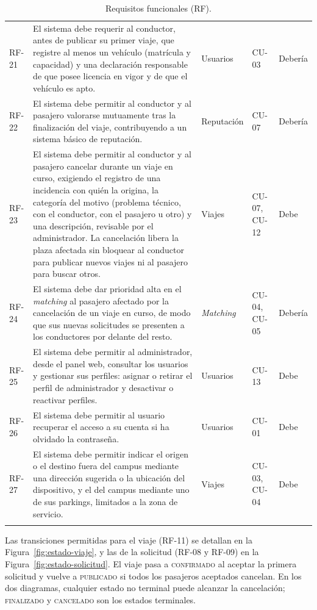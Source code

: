 \begin{longtable}{p{1.2cm} p{7.0cm} p{2.7cm} p{1.3cm} p{1.6cm}}
  RF-21 & El sistema debe requerir al conductor, antes de publicar su primer viaje, que registre al menos un vehículo (matrícula y capacidad) y una declaración responsable de que posee licencia en vigor y de que el vehículo es apto. & Usuarios & CU-03 & Debería \\
  RF-22 & El sistema debe permitir al conductor y al pasajero valorarse mutuamente tras la finalización del viaje, contribuyendo a un sistema básico de reputación. & Reputación & CU-07 & Debería \\
  RF-23 & El sistema debe permitir al conductor y al pasajero cancelar durante un viaje en curso, exigiendo el registro de una incidencia con quién la origina, la categoría del motivo (problema técnico, con el conductor, con el pasajero u otro) y una descripción, revisable por el administrador. La cancelación libera la plaza afectada sin bloquear al conductor para publicar nuevos viajes ni al pasajero para buscar otros. & Viajes & CU-07, CU-12 & Debe \\
  RF-24 & El sistema debe dar prioridad alta en el \textit{matching} al pasajero afectado por la cancelación de un viaje en curso, de modo que sus nuevas solicitudes se presenten a los conductores por delante del resto. & \textit{Matching} & CU-04, CU-05 & Debería \\
  RF-25 & El sistema debe permitir al administrador, desde el panel web, consultar los usuarios y gestionar sus perfiles: asignar o retirar el perfil de administrador y desactivar o reactivar perfiles. & Usuarios & CU-13 & Debe \\
  RF-26 & El sistema debe permitir al usuario recuperar el acceso a su cuenta si ha olvidado la contraseña. & Usuarios & CU-01 & Debe \\
  RF-27 & El sistema debe permitir indicar el origen o el destino fuera del campus mediante una dirección sugerida o la ubicación del dispositivo, y el del campus mediante uno de sus parkings, limitados a la zona de servicio. & Viajes & CU-03, CU-04 & Debe \\
  \hline
  \caption{Requisitos funcionales (RF).}
  \label{tab:rf}
\end{longtable}

Las transiciones permitidas para el viaje (RF-11) se detallan en la Figura~\ref{fig:estado-viaje}, y las de la solicitud (RF-08 y RF-09) en la Figura~\ref{fig:estado-solicitud}. El viaje pasa a \textsc{confirmado} al aceptar la primera solicitud y vuelve a \textsc{publicado} si todos los pasajeros aceptados cancelan. En los dos diagramas, cualquier estado no terminal puede alcanzar la cancelación; \textsc{finalizado} y \textsc{cancelado} son los estados terminales.

